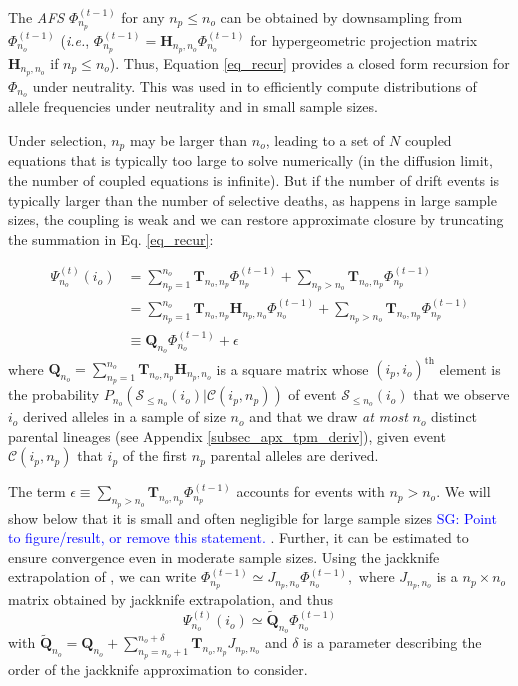 \documentclass[9pt,twocolumn,twoside,lineno]{gsajnl}
\newcommand{\afs}[2]{\Phi_{#1}^{(#2)}}
\newcommand{\afsPsi}[2]{\Psi_{#1}^{(#2)}}
\newcommand{\ms}{\mathcal{S}}
\newcommand{\sgcomment}[1]{\textcolor{blue}{SG: #1}}
\begin{document}
The \textit{AFS}  $\afs{n_p}{t-1}$ for any  $n_p\leq n_o$ can be obtained by downsampling from $\afs{n_o}{t-1}$ (\textit{i.e.}, $\afs{n_p}{t-1} =
\mathbf{H}_{n_p,n_o} \afs{n_o}{t-1}$ for hypergeometric projection matrix $\mathbf{H}_{n_p,n_o}$ if
$n_p\leq n_o$). Thus, Equation \eqref{eq_recur} provides a closed form recursion for $\Phi_{n_o}$ under neutrality. 
This was used in \cite{JouganousEtAl2017} to efficiently 
compute distributions of allele frequencies under neutrality and in small sample sizes.

Under selection, $n_{p}$ may be larger than $n_o$, leading to a set of $N$ coupled equations that is
typically too large to solve numerically (in the diffusion limit, the number of coupled equations is
infinite). But if the number of drift events is typically larger than the number of selective
deaths, as happens in large sample sizes, the coupling is weak and we can restore approximate
closure by truncating the summation in Eq. \ref{eq_recur}:

\begin{equation}
\begin{split}
  \afsPsi{n_o}{t}(i_o)
  &= \sum_{n_p=1}^{n_{o}} \mathbf{T}_{n_o,n_p}  \afs{n_p}{t-1}+ \sum_{n_p> n_o }  \mathbf{T}_{n_o,n_p} \afs{n_p}{t-1} \\
  &=      \sum_{n_p=1}^{n_{o}} \mathbf{T}_{n_o,n_p} \mathbf{H}_{n_p,n_o} \afs{n_o}{t-1}+ \sum_{n_p> n_o }  \mathbf{T}_{n_o,n_p} \afs{n_p}{t-1} \\
  &\equiv \mathbf{Q}_{n_o}                                               \afs{n_o}{t-1}+ \epsilon
\end{split}
\label{eq_truncated}
\end{equation}
where $\mathbf{Q}_{n_o} =  \sum_{n_p=1}^{n_{o}} \mathbf{T}_{n_o,n_p} \mathbf{H}_{n_p,n_o}$ is a
square matrix whose $(i_p,i_o)^\text{th}$ element is the probability $P_{n_o}(\mathcal{S}_{\leq n_o}
(i_o)| \mathcal{C}(i_p,n_p))$ of event $\ms_{\leq n_o}(i_o)$ that we observe $i_o$ derived alleles
in a sample of size $n_o$ and that we draw \emph{at most} $n_o$ distinct parental lineages (see
Appendix \ref{subsec_apx_tpm_deriv}), given event $\mathcal{C}(i_p,n_p)$ that $i_p$ of the first
$n_p$ parental alleles are derived.  

The term $\epsilon \equiv \sum_{n_p> n_o }  \mathbf{T}_{n_o,n_p} \afs{n_p}{t-1} $ 
accounts for events with $n_p>n_o.$ We will show below that it is small and often 
negligible for large sample sizes \sgcomment{Point to figure/result, or remove this statement. }. 
Further, it can be estimated to ensure convergence even in moderate sample sizes.  
Using the jackknife extrapolation of \citep{Gravel2016}, we can write  
$\afs{n_p}{t-1} \simeq J_{n_p,n_o} \afs{n_o}{t-1},$ where $J_{n_p,n_o}$ is a $n_p\times n_o$
matrix obtained by jackknife extrapolation, and thus
\begin{equation}
  \afsPsi{n_o}{t}(i_o) \simeq \tilde{\mathbf{Q}}_{n_o}        \afs{n_o}{t-1}
\label{eq_truncated_jack}
\end{equation}
with  $ \tilde{\mathbf{Q}}_{n_o} =  \mathbf{Q}_{n_o}  +   \sum_{n_p=n_o+1 }^{n_o+\delta}  \mathbf{T}_{n_o,n_p} J_{n_p,n_o}$
and $\delta$ is a parameter describing the order of the jackknife approximation to consider. 
\end{document}
